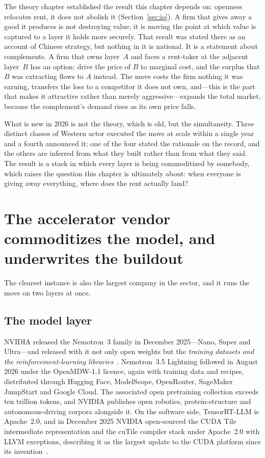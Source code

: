 The theory chapter established the result this chapter depends on: openness relocates rent, it does not abolish it (Section~\ref{sec:io}). A firm that gives away a good it produces is not destroying value; it is moving the point at which value is captured to a layer it holds more securely. That result was stated there as an account of Chinese strategy, but nothing in it is national. It is a statement about complements. A firm that owns layer~$A$ and faces a rent-taker at the adjacent layer~$B$ has an option: drive the price of $B$ to marginal cost, and the surplus that $B$ was extracting flows to $A$ instead. The move costs the firm nothing it was earning, transfers the loss to a competitor it does not own, and---this is the part that makes it attractive rather than merely aggressive---expands the total market, because the complement's demand rises as its own price falls.

What is new in 2026 is not the theory, which is old, but the simultaneity. Three distinct classes of Western actor executed the move at scale within a single year and a fourth announced it; one of the four stated the rationale on the record, and the others are inferred from what they built rather than from what they said. The result is a stack in which every layer is being commoditized by somebody, which raises the question this chapter is ultimately about: when everyone is giving away everything, where does the rent actually land?

\section{The accelerator vendor commoditizes the model, and underwrites the buildout}
\label{sec:mirror-nvidia}

The clearest instance is also the largest company in the sector, and it runs the move on two layers at once.

\subsection{The model layer}

NVIDIA released the Nemotron~3 family in December 2025---Nano, Super and Ultra---and released with it not only open weights but the \emph{training datasets and the reinforcement-learning libraries}~\cite{nemotron}. Nemotron~3.5 Lightning followed in August 2026 under the OpenMDW-1.1 licence, again with training data and recipes, distributed through Hugging Face, ModelScope, OpenRouter, SageMaker JumpStart and Google Cloud. The associated open pretraining collection exceeds ten trillion tokens, and NVIDIA publishes open robotics, protein-structure and autonomous-driving corpora alongside it. On the software side, TensorRT-LLM is Apache~2.0, and in December 2025 NVIDIA open-sourced the CUDA Tile intermediate representation and the cuTile compiler stack under Apache~2.0 with LLVM exceptions, describing it as the largest update to the CUDA platform since its invention~\cite{cuda-tile}.

